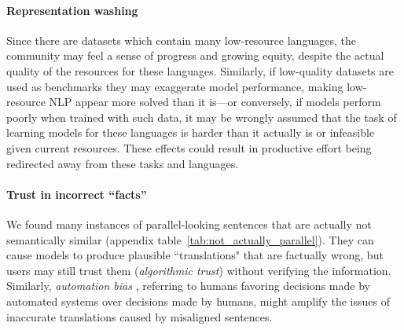 \paragraph{Representation washing}
Since there are datasets which contain many low-resource languages, the community may feel a sense of progress and growing equity, despite the actual quality of the resources for these languages. %
Similarly, if low-quality datasets are used as benchmarks they may exaggerate model performance, making low-resource NLP appear more solved than it is---or conversely, if models perform poorly when trained with such data, it may be wrongly assumed that the task of learning models for these languages is harder than it actually is or infeasible given current resources. These effects could result in productive effort being redirected away from these tasks and languages.

\paragraph{Trust in incorrect ``facts''} %
We found many instances of parallel-looking sentences that are actually not semantically similar (appendix table~\ref{tab:not_actually_parallel}). They can cause models to produce plausible ``translations" that are factually wrong, but users may still trust them (\textit{algorithmic trust}) without verifying the information. %
Similarly, \textit{automation bias} \citep{skitka-etal-1999-does},
referring to humans favoring decisions made by automated systems over decisions made by humans, might amplify the issues of inaccurate translations caused by misaligned sentences.


